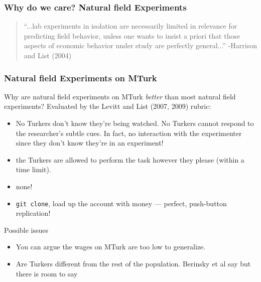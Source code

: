 \documentclass[slides]{beamer} %
\begin{document}
\begin{frame}\frametitle{Why do we care? Natural field Experiments}


\begin{quotation}
``...lab 
experiments in isolation are necessarily limited in relevance for
predicting field behavior, unless one wants
to insist a priori that those aspects of economic
behavior under study are perfectly
general...'' -Harrison and List (2004)
\end{quotation}

\end{frame}

\begin{frame}\frametitle{Natural field Experiments on MTurk}

Why are natural field experiments on MTurk \textit{better} than most natural field experiments? Evaluated by the Levitt and List (2007, 2009) rubric: \pause 

\begin{itemize}
\scriptsize
\item {}  \pause No  Turkers don't know they're being watched.  \pause No  Turkers cannot respond to the researcher's subtle cues. In fact, no interaction with the experimenter since they don't know they're in an experiment!
\item {}  \pause the Turkers are allowed to perform the task however they please (within a time limit).
\item {}  \pause none!
\item {}  \pause \texttt{git clone}, load up the account with money --- perfect, push-button replication!
\end{itemize}

Possible issues

\begin{itemize}
\scriptsize
\item {}  \pause You can argue the wages on MTurk are too low to generalize. \pause
\item {}  \pause Are Turkers different from the rest of the population. Berinsky et al say  but there is room to say 
\end{itemize}

\end{frame}
\end{document}

